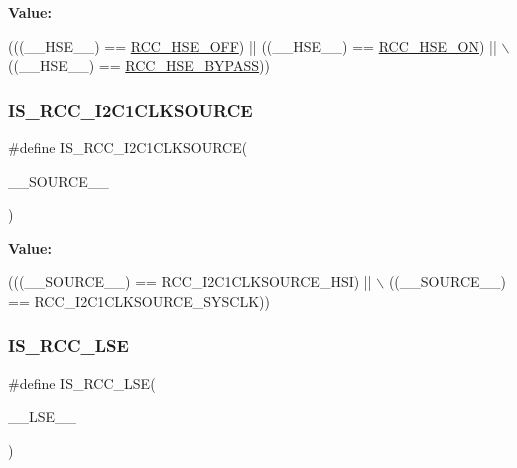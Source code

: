 {\bfseries Value\+:}
\begin{DoxyCode}
(((\_\_HSE\_\_) == \hyperlink{group___r_c_c___h_s_e___config_ga1616626d23fbce440398578855df6f97}{RCC\_HSE\_OFF}) || ((\_\_HSE\_\_) == \hyperlink{group___r_c_c___h_s_e___config_gabc4f70a44776c557af20496b04d9a9db}{RCC\_HSE\_ON}) || \(\backslash\)
                             ((\_\_HSE\_\_) == \hyperlink{group___r_c_c___h_s_e___config_ga5ca515db2d5c4d5bdb9ee3d154df2704}{RCC\_HSE\_BYPASS}))
\end{DoxyCode}
\mbox{\label{group___r_c_c___private___macros_ga08abf8048ad8806f0fb9199ee3095436}} 
\subsubsection{\texorpdfstring{I\+S\+\_\+\+R\+C\+C\+\_\+\+I2\+C1\+C\+L\+K\+S\+O\+U\+R\+CE}{IS\_RCC\_I2C1CLKSOURCE}}
{\footnotesize\ttfamily \#define I\+S\+\_\+\+R\+C\+C\+\_\+\+I2\+C1\+C\+L\+K\+S\+O\+U\+R\+CE(\begin{DoxyParamCaption}\item[{}]{\+\_\+\+\_\+\+S\+O\+U\+R\+C\+E\+\_\+\+\_\+ }\end{DoxyParamCaption})}

{\bfseries Value\+:}
\begin{DoxyCode}
(((\_\_SOURCE\_\_) == RCC\_I2C1CLKSOURCE\_HSI) || \(\backslash\)
                                           ((\_\_SOURCE\_\_) == RCC\_I2C1CLKSOURCE\_SYSCLK))
\end{DoxyCode}
\mbox{\label{group___r_c_c___private___macros_ga6c766af016cdc1d63f1ed64c5082737c}} 
\subsubsection{\texorpdfstring{I\+S\+\_\+\+R\+C\+C\+\_\+\+L\+SE}{IS\_RCC\_LSE}}
{\footnotesize\ttfamily \#define I\+S\+\_\+\+R\+C\+C\+\_\+\+L\+SE(\begin{DoxyParamCaption}\item[{}]{\+\_\+\+\_\+\+L\+S\+E\+\_\+\+\_\+ }\end{DoxyParamCaption})}


